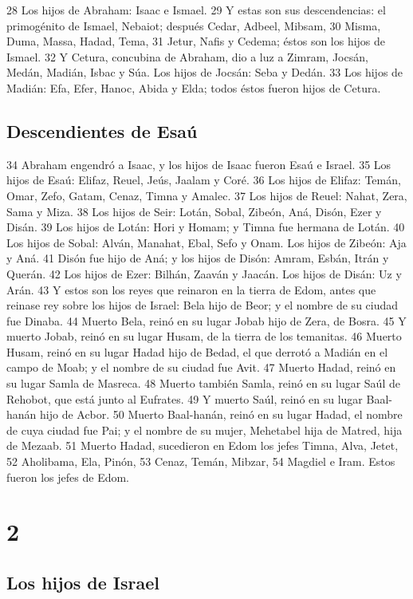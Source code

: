 28 Los hijos de Abraham: Isaac e Ismael.
29 Y estas son sus descendencias: el primogénito de Ismael, Nebaiot; después Cedar, Adbeel, Mibsam,
30 Misma, Duma, Massa, Hadad, Tema,
31 Jetur, Nafis y Cedema; éstos son los hijos de Ismael.
32 Y Cetura, concubina de Abraham, dio a luz a Zimram, Jocsán, Medán, Madián, Isbac y Súa. Los hijos de Jocsán: Seba y Dedán.
33 Los hijos de Madián: Efa, Efer, Hanoc, Abida y Elda; todos éstos fueron hijos de Cetura.

\section*{Descendientes de Esaú}

34 Abraham engendró a Isaac, y los hijos de Isaac fueron Esaú e Israel.
35 Los hijos de Esaú: Elifaz, Reuel, Jeús, Jaalam y Coré.
36 Los hijos de Elifaz: Temán, Omar, Zefo, Gatam, Cenaz, Timna y Amalec.
37 Los hijos de Reuel: Nahat, Zera, Sama y Miza.
38 Los hijos de Seir: Lotán, Sobal, Zibeón, Aná, Disón, Ezer y Disán.
39 Los hijos de Lotán: Hori y Homam; y Timna fue hermana de Lotán.
40 Los hijos de Sobal: Alván, Manahat, Ebal, Sefo y Onam. Los hijos de Zibeón: Aja y Aná.
41 Disón fue hijo de Aná; y los hijos de Disón: Amram, Esbán, Itrán y Querán.
42 Los hijos de Ezer: Bilhán, Zaaván y Jaacán. Los hijos de Disán: Uz y Arán.
43 Y estos son los reyes que reinaron en la tierra de Edom, antes que reinase rey sobre los hijos de Israel: Bela hijo de Beor; y el nombre de su ciudad fue Dinaba.
44 Muerto Bela, reinó en su lugar Jobab hijo de Zera, de Bosra.
45 Y muerto Jobab, reinó en su lugar Husam, de la tierra de los temanitas.
46 Muerto Husam, reinó en su lugar Hadad hijo de Bedad, el que derrotó a Madián en el campo de Moab; y el nombre de su ciudad fue Avit.
47 Muerto Hadad, reinó en su lugar Samla de Masreca.
48 Muerto también Samla, reinó en su lugar Saúl de Rehobot, que está junto al Eufrates.
49 Y muerto Saúl, reinó en su lugar Baal-hanán hijo de Acbor.
50 Muerto Baal-hanán, reinó en su lugar Hadad, el nombre de cuya ciudad fue Pai; y el nombre de su mujer, Mehetabel hija de Matred, hija de Mezaab.
51 Muerto Hadad, sucedieron en Edom los jefes Timna, Alva, Jetet,
52 Aholibama, Ela, Pinón,
53 Cenaz, Temán, Mibzar,
54 Magdiel e Iram. Estos fueron los jefes de Edom.

\chapter{2}

\section*{Los hijos de Israel}

